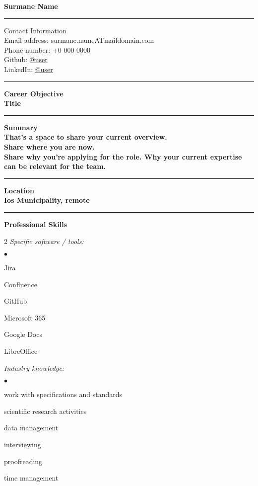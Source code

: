 \documentclass[oneside,final,12pt]{extreport}
\newenvironment{compactlist}{
	\begin{list}{{$\bullet$}}{
		\setlength\leftmargin{0.4cm}
		\setlength\partopsep{0pt}
		\setlength\parskip{0pt}
		\setlength\parsep{0pt}
		\setlength\topsep{0pt}
		\setlength\itemsep{0pt}
	}
}{
	\end{list}
}
\begin{document}
\bfseries
Surmane Name \\
\rule{\textwidth}{0.4pt}
Contact Information \\
\noindent
\mdseries
Email address: 
surmane.nameATmaildomain.com \\
Phone number: 
+0 000 0000 \\
Github:
\href{https://github.com/user}{@user} \\
LinkedIn:
\href{https://www.linkedin.com/in/username}{@user} \\
\rule{\textwidth}{0.4pt}

\bfseries
Career Objective \\
\mdseries
Title \\
\rule{\textwidth}{0.4pt}

\bfseries
Summary \\
\mdseries
That's a space to share your current overview. \\
Share where you are now. \\[5pt]
Share why you're applying for the role. Why your current expertise can be relevant for the team. \\
\rule{\textwidth}{0.4pt}

\bfseries
Location \\
\mdseries
Ios Municipality, remote \\
\rule{\textwidth}{0.4pt}

\bfseries
Professional Skills
\mdseries
\begin{multicols}{2}
\textsl{Specific software / tools:}
	\begin{compactlist}
		\item Jira 
		\item Confluence
		\item GitHub
		\item Microsoft 365
		\item Google Docs
		\item LibreOffice
	\end{compactlist}
\textsl{Industry knowledge:}
	\begin{compactlist}
		\item work with specifications and standards
		\item scientific research activities
		\item data management
		\item interviewing
		\item proofreading
		\item time management
	\end{compactlist}
\end{multicols}
\end{document}
